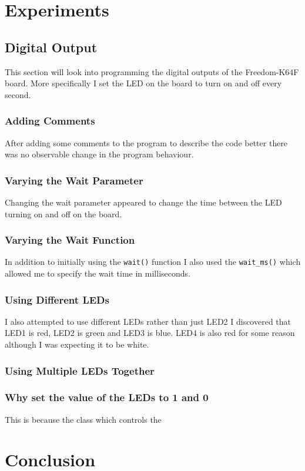 \documentclass[a4paper,12pt]{scrartcl}
\begin{document}
	\section{Experiments}
	{
		\subsection{Digital Output}
		{
			This section will look into programming the digital outputs of the Freedom-K64F board. More specifically I set the LED on the board to turn on and off every second.
			\subsubsection{Adding Comments}
			{
				After adding some comments to the program to describe the code better there was no observable change in the program behaviour. 
			}
			\subsubsection{Varying the Wait Parameter}
			{
				Changing the wait parameter appeared to change the time between the LED turning on and off on the board.
			}
			\subsubsection{Varying the Wait Function}
			{
				In addition to initially using the \lstinline|wait()| function I also used the \lstinline|wait_ms()| which allowed me to specify the wait time in milliseconds.
			}
			\subsubsection{Using Different LEDs}
			{
				I also attempted to use different LEDs rather than just LED2 I discovered that LED1 is red, LED2 is green and LED3 is blue. LED4 is also red for some reason although I was expecting it to be white.
			}
			\subsubsection{Using Multiple LEDs Together}
			{
				
			}
			\subsubsection{Why set the value of the LEDs to 1 and 0}
			{
				This is because the class which controls the 
			}
		}
	}

	\section{Conclusion}
	{
	
	}
	
	\newpage
	
	\printbibliography[heading=bibintoc,title=References]
\end{document}
